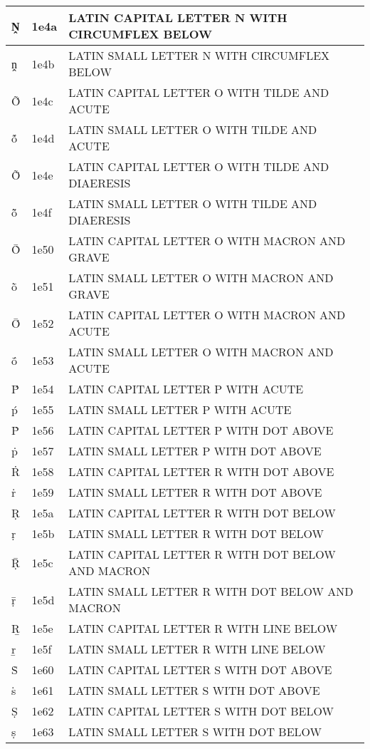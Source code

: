 \documentclass[12pt,letterpaper,openany]{book}
\begin{document}
\begin{center}
\begin{supertabular}{|m{0.25in}|m{0.5in}|m{4in}|}
			Ṋ & 1e4a & LATIN CAPITAL LETTER N WITH CIRCUMFLEX BELOW\\\hline
			ṋ & 1e4b & LATIN SMALL LETTER N WITH CIRCUMFLEX BELOW\\\hline
			Ṍ & 1e4c & LATIN CAPITAL LETTER O WITH TILDE AND ACUTE\\\hline
			ṍ & 1e4d & LATIN SMALL LETTER O WITH TILDE AND ACUTE\\\hline
			Ṏ & 1e4e & LATIN CAPITAL LETTER O WITH TILDE AND DIAERESIS\\\hline
			ṏ & 1e4f & LATIN SMALL LETTER O WITH TILDE AND DIAERESIS\\\hline
			Ṑ & 1e50 & LATIN CAPITAL LETTER O WITH MACRON AND GRAVE\\\hline
			ṑ & 1e51 & LATIN SMALL LETTER O WITH MACRON AND GRAVE\\\hline
			Ṓ & 1e52 & LATIN CAPITAL LETTER O WITH MACRON AND ACUTE\\\hline
			ṓ & 1e53 & LATIN SMALL LETTER O WITH MACRON AND ACUTE\\\hline
			Ṕ & 1e54 & LATIN CAPITAL LETTER P WITH ACUTE\\\hline
			ṕ & 1e55 & LATIN SMALL LETTER P WITH ACUTE\\\hline
			Ṗ & 1e56 & LATIN CAPITAL LETTER P WITH DOT ABOVE\\\hline
			ṗ & 1e57 & LATIN SMALL LETTER P WITH DOT ABOVE\\\hline
			Ṙ & 1e58 & LATIN CAPITAL LETTER R WITH DOT ABOVE\\\hline
			ṙ & 1e59 & LATIN SMALL LETTER R WITH DOT ABOVE\\\hline
			Ṛ & 1e5a & LATIN CAPITAL LETTER R WITH DOT BELOW\\\hline
			ṛ & 1e5b & LATIN SMALL LETTER R WITH DOT BELOW\\\hline
			Ṝ & 1e5c & LATIN CAPITAL LETTER R WITH DOT BELOW AND MACRON\\\hline
			ṝ & 1e5d & LATIN SMALL LETTER R WITH DOT BELOW AND MACRON\\\hline
			Ṟ & 1e5e & LATIN CAPITAL LETTER R WITH LINE BELOW\\\hline
			ṟ & 1e5f & LATIN SMALL LETTER R WITH LINE BELOW\\\hline
			Ṡ & 1e60 & LATIN CAPITAL LETTER S WITH DOT ABOVE\\\hline
			ṡ & 1e61 & LATIN SMALL LETTER S WITH DOT ABOVE\\\hline
			Ṣ & 1e62 & LATIN CAPITAL LETTER S WITH DOT BELOW\\\hline
			ṣ & 1e63 & LATIN SMALL LETTER S WITH DOT BELOW\\\hline

\end{supertabular}
\end{center}
\end{document}
